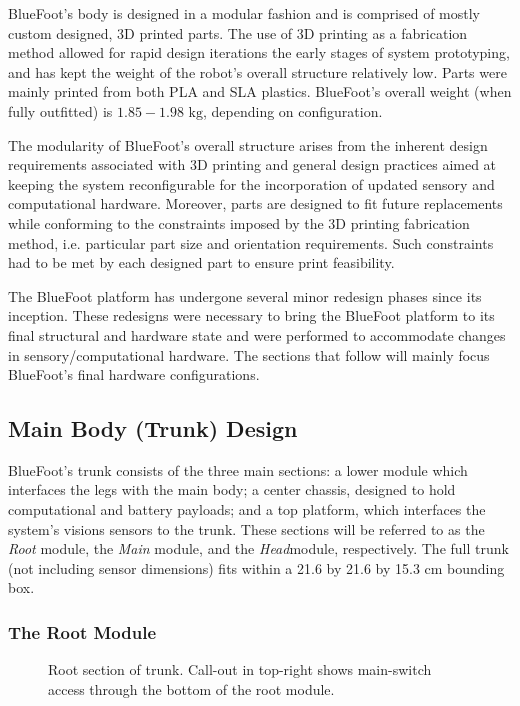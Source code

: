 		BlueFoot's body is designed in a modular fashion and is comprised of mostly custom designed, 3D printed parts. The use of 3D printing as a fabrication method allowed for rapid design iterations the early stages of system prototyping, and has kept the weight of the robot's overall structure relatively low. Parts were mainly printed from both PLA and SLA plastics. BlueFoot's overall weight (when fully outfitted) is $1.85-1.98 \text{ kg}$, depending on configuration.

		The modularity of BlueFoot's overall structure arises from the inherent design requirements associated with 3D printing and general design practices aimed at keeping the system reconfigurable for the incorporation of updated sensory and computational hardware. Moreover, parts are designed to fit future replacements while conforming to the constraints imposed by the 3D printing fabrication method, i.e. particular part size and orientation requirements. Such constraints had to be met by each designed part to ensure print feasibility. 

		The BlueFoot platform has undergone several minor redesign phases since its inception. These redesigns were necessary to bring the BlueFoot platform to its final structural and hardware state and were performed to accommodate changes in  sensory/computational hardware. The sections that follow will mainly focus BlueFoot's final hardware configurations.

		\subsection{Main Body (Trunk) Design}
		
			BlueFoot's trunk consists of the three main sections: a lower module which interfaces the legs with the main body; a center chassis, designed to  hold computational and battery payloads; and a top platform, which interfaces the system's visions sensors to the trunk. These sections will be referred to as the \emph{Root} module, the \emph{Main} module, and the \emph{Head}module, respectively. The full trunk (not including sensor dimensions) fits within a 21.6 by 21.6 by 15.3 cm bounding box. 

			\subsubsection{The Root Module}

				\begin{figure}[h!]
					\centering
					\caption{Root section of trunk. Call-out in top-right shows main-switch access through the bottom of the root module.}
					\label{fig::root_module}
				\end{figure}

